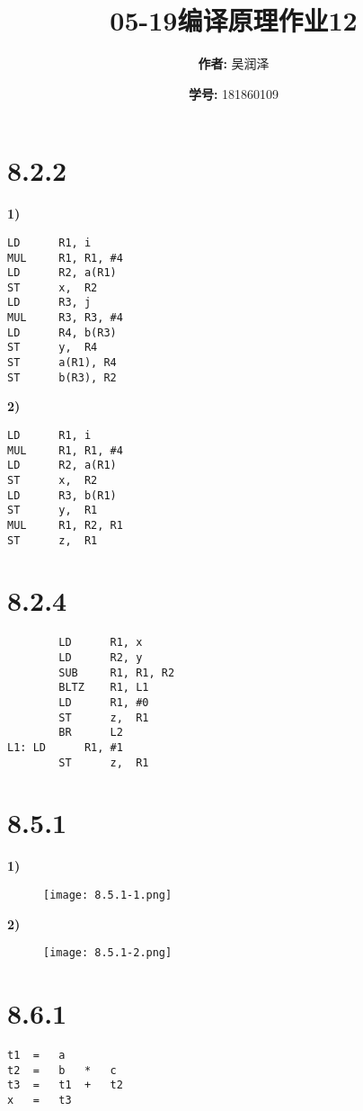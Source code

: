 \documentclass[11pt]{article}
\title{05-19编译原理作业12	}
\author{
			\textbf{作者:} {吴润泽}
			\and {\textbf{学号:} 181860109}
		}
\begin{document}
\maketitle
\section*{8.2.2}
\noindent\textbf{1)}
\begin{lstlisting}
LD		R1,	i
MUL		R1,	R1, #4
LD		R2,	a(R1)
ST		x,	R2
LD		R3,	j
MUL		R3,	R3, #4
LD		R4,	b(R3)
ST		y,	R4
ST		a(R1), R4
ST		b(R3), R2
\end{lstlisting}
\textbf{2)}
\begin{lstlisting}
LD		R1, i
MUL		R1, R1, #4
LD		R2, a(R1)
ST		x,	R2
LD		R3, b(R1)
ST		y,	R1
MUL		R1,	R2,	R1
ST		z,	R1
\end{lstlisting}
\section*{8.2.4}
\begin{lstlisting}
		LD		R1,	x
		LD		R2,	y
		SUB		R1,	R1,	R2
		BLTZ	R1,	L1
		LD		R1,	#0
		ST		z,	R1
		BR		L2
L1:	LD		R1,	#1
		ST		z,	R1	
\end{lstlisting}
\section*{8.5.1}
\noindent\textbf{1)}
\begin{figure}[H]
	\centering
	\label{fig:8.5.1-1}
	\texttt{[image: 8.5.1-1.png]}
\end{figure}
\noindent\textbf{2)}
\begin{figure}[H]
	\centering
	\label{fig:8.5.1-2}
	\texttt{[image: 8.5.1-2.png]}
\end{figure}
\section*{8.6.1}
\begin{lstlisting}
t1	=	a
t2	=	b	*	c
t3	=	t1	+	t2
x	=	t3
\end{lstlisting}
\end{document}
